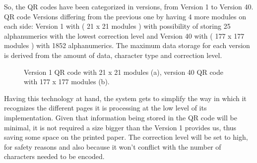 So, the QR codes have been categorized in versions, from Version 1 to Version 40.  QR code Versions differing from the previous one by having 4 more modules on each side: Version 1 with ( 21 x 21 modules ) with possibility of storing 25 alphanumerics with the lowest correction level and Version 40 with  ( 177 x 177 modules ) with 1852 alphanumerics. The maximum data storage for each version is derived from the amount of data, character type and correction level.


\begin{figure}[!ht]
  \centering
 \hspace{0.09cm}
  \caption{Version 1 QR code with 21 x 21 modules (a), version 40 QR code with 177 x 177 modules (b).}
  \label{fig1.1}
\end{figure}



Having this technology at hand, the system gets to simplify the way in which it recognizes the different pages it is processing at the low level of its implementation. Given that information being stored in the QR code will be minimal, it is not required a size bigger than the Version 1 provides us, thus saving some space on the printed paper. The correction level will be set to high, for safety reasons and also because it won’t conflict with the number of characters needed to be encoded.

\clearpage


